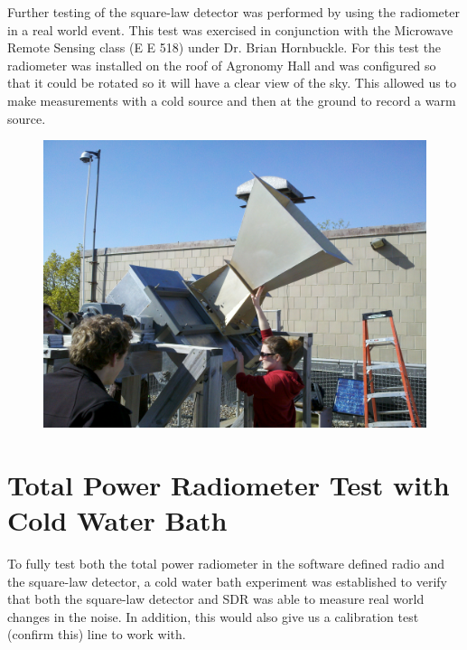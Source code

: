 Further testing of the square-law detector was performed by using the radiometer in a real world event.  This test was exercised in conjunction with the Microwave Remote Sensing class (E E 518) under Dr. Brian Hornbuckle.  For this test the radiometer was installed on the roof of Agronomy Hall and was configured so that it could be rotated so it will have a clear view of the sky.  This allowed us to make measurements with a cold source and then at the ground to record a warm source.


{\begin{figure}[h!tb] 
\centering
\includegraphics[width=\textwidth]{Images/radiometer_roof.jpg}
\label{radiometer_roof}
\end{figure}
}

\section{Total Power Radiometer Test with Cold Water Bath}
To fully test both the total power radiometer in the software defined radio and the square-law detector, a cold water bath experiment was established to verify that both the square-law detector and SDR was able to measure real world changes in the noise.  In addition, this would also give us a calibration test (confirm this) line to work with.

